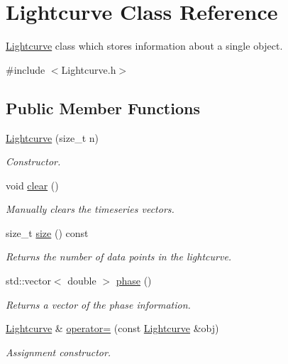 \hypertarget{classLightcurve}{
\section{Lightcurve Class Reference}
\label{classLightcurve}
}


\hyperlink{classLightcurve}{Lightcurve} class which stores information about a single object.  




{\ttfamily \#include $<$Lightcurve.h$>$}

\subsection*{Public Member Functions}
\begin{DoxyCompactItemize}
\item 
\hyperlink{classLightcurve_a1145dcf51e49e3ce069a0aad4ad11e92}{Lightcurve} (size\_\-t n)
\begin{DoxyCompactList}\small\item\em Constructor. \item\end{DoxyCompactList}\item 
void \hyperlink{classLightcurve_a5318d441e2d04d71ef10b7509f823e92}{clear} ()
\begin{DoxyCompactList}\small\item\em Manually clears the timeseries vectors. \item\end{DoxyCompactList}\item 
size\_\-t \hyperlink{classLightcurve_aa5cc8769e52679a9cc17e8c2782acbf0}{size} () const 
\begin{DoxyCompactList}\small\item\em Returns the number of data points in the lightcurve. \item\end{DoxyCompactList}\item 
std::vector$<$ double $>$ \hyperlink{classLightcurve_a134469345638f682f3af941b6994aa92}{phase} ()
\begin{DoxyCompactList}\small\item\em Returns a vector of the phase information. \item\end{DoxyCompactList}\item 
\hyperlink{classLightcurve}{Lightcurve} \& \hyperlink{classLightcurve_a51cf49532fe7981cabf91a51ad114013}{operator=} (const \hyperlink{classLightcurve}{Lightcurve} \&obj)
\begin{DoxyCompactList}\small\item\em Assignment constructor. \item\end{DoxyCompactList}\end{DoxyCompactItemize}
